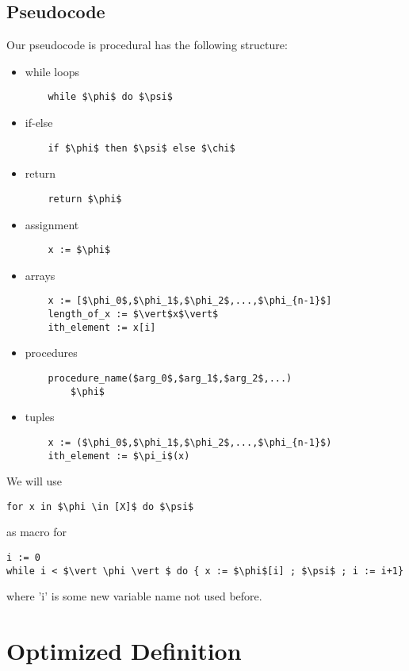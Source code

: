 \documentclass[12pt]{article}
\begin{document}
\subsection{Pseudocode}
Our pseudocode is procedural has the following structure:
\begin{itemize}
	\item while loops
	\begin{lstlisting}
	while $\phi$ do $\psi$ 
	\end{lstlisting}
	\item if-else 
	\begin{lstlisting}
	if $\phi$ then $\psi$ else $\chi$ 
	\end{lstlisting}
	\item return
	\begin{lstlisting}
	return $\phi$
	\end{lstlisting}
	\item assignment
    \begin{lstlisting}
	x := $\phi$
	\end{lstlisting}
	\item arrays
	\begin{lstlisting}
	x := [$\phi_0$,$\phi_1$,$\phi_2$,...,$\phi_{n-1}$]
	length_of_x := $\vert$x$\vert$ 
	ith_element := x[i]
	\end{lstlisting}
	\item procedures
	\begin{lstlisting}
	procedure_name($arg_0$,$arg_1$,$arg_2$,...)
		$\phi$
	\end{lstlisting}
	\item tuples
	\begin{lstlisting}
	x := ($\phi_0$,$\phi_1$,$\phi_2$,...,$\phi_{n-1}$)
	ith_element := $\pi_i$(x)
	\end{lstlisting}
\end{itemize}
We will use
\begin{lstlisting}
for x in $\phi \in [X]$ do $\psi$ 
\end{lstlisting}
as macro for 
\begin{lstlisting}
i := 0
while i < $\vert \phi \vert $ do { x := $\phi$[i] ; $\psi$ ; i := i+1}
\end{lstlisting}
where 'i' is some new variable name not used before.


\section{Optimized Definition}
\end{document}
